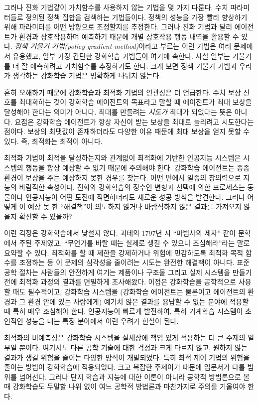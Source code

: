 그러나 진화 기법같이 가치함수를 사용하지 않는 기법을 몇 가지 다룬다. 수치
파라미터들로 정의된 정책 집합을 검색하는 기법들이다. 정책의 성능을 가장 빨리
향상하기 위해 파라미터를 어떤 방향으로 조정할지를 추정한다. 그러나 진화 기법과
달리 에이전트가 환경과 상호작용하며 예측하기 때문에 개별 상호작용 행동 내역을
활용할 수 있다. \emph{정책 기울기 기법(policy gradient method)}이라고 부르는
이런 기법은 여러 문제에서 유용했고, 일부 가장 간단한 강화학습 기법들이 여기에
속한다. 사실 일부는 기울기를 더 잘 예측하려고 가치함수를 추정하기도 한다. 크게
보면 정책 기울기 기법과 우리가 생각하는 강화학습 기법은 명확하게 나뉘지 않는다.

흔히 오해하기 때문에 강화학습과 최적화 기법의 연관성은 더 언급한다. 수치 보상
신호를 최대화하는 것이 강화학습 에이전트의 목표라고 말할 때 에이전트가 최대
보상을 달성해야 한다는 의미가 아니다. 최대를 만들려는 \emph{시도가} 최대가
되었다는 뜻은 아니다. 요점은 강화학습 에이전트가 항상 자신이 받는 보상을 최대로
늘리려고 시도한다는 점이다. 보상의 최댓값이 존재하더라도 다양한 이유 때문에 최대
보상을 얻지 못할 수 있다. 즉, 최적화는 최적이 아니다.


최적화 기법이 최적을 달성하는지와 관계없이 최적화에 기반한 인공지능 시스템은
시스템의 행동을 항상 예상할 수 없기 때문에 주의해야 한다. 강화학습 에이전트는
종종 환경이 보상을 주는 예상하지 못한 경우를 찾는다. 어떤 면에서 일종의
창의력으로 지능의 바람직한 속성이다. 진화와 강화학습의 정수인 변형과 선택에 의한
프로세스는 동물이나 인공지능이 어떤 도전에 직면하더라도 새로운 성공 방식을
발견한다. 그러나 어떻게 이 예상 못 한 ``해결책''이 의도하지 않거나 바람직하지
않은 결과를 가져오지 않을지 확신할 수 있을까?

이런 걱정은 강화학습에서 낯설지 않다. 괴테의 1797년 시 ``마법사의 제자'' 같이
문학에서 주된 주제였고, ``무언가를 바랄 때는 실제로 생길 수 있으니
조심해라''라는 말로 요약할 수 있다. 최적화를 할 때 제한을 강제하거나 위험에
민감하도록 최적화 목적 함수를 조정하는 등 이 문제의 심각성을 줄이려는 시도는
완전한 해결책이 아니다. 표준 공학 절차는 사람들의 안전하게 여기는 제품이나
구조물 그리고 실제 시스템을 만들기 전에 최적화 과정의 결과를 면밀하게
조사해왔다. 이점은 강화학습을 공학적으로 사용할 때도 필수적이고, 강화학습
시스템을 (강화학습 에이전트는 물론이고 에이전트의 환경과 그 환경 안에 있는
사람에게) 예기치 않은 결과를 용납할 수 없는 분야에 적용할 때 특히 매우 조심해야
한다. 인공지능이 빠르게 발전하여, 특히 기계학습 시스템이 초인적인 성능을 내는
특정 분야에서 이런 우려가 현실이 된다.

최적화의 비예측성은 강화학습 시스템을 실세상에 책임 있게 적용하는 더 큰 주제의
일부일 뿐이다. 여기서도 다른 공학 기술에 대한 걱정과 크게 다르지 않고, 원하지
않는 결과가 생길 위험을 줄이는 다양한 방식이 개발되었다. 특히 최적 제어 기법의
위험을 줄이는 방법이 강화학습에 적용되었다. 크고 복잡한 주제이기 때문에
입문서가 다룰 범위를 넘어선다. 그러나 단지 학습과 지능에 대한 이론이 아니라
공학적 방법론으로 볼 때 강화학습도 두말할 나위 없이 여느 공학적 방법론과
마찬가지로 주의를 기울여야 한다.

